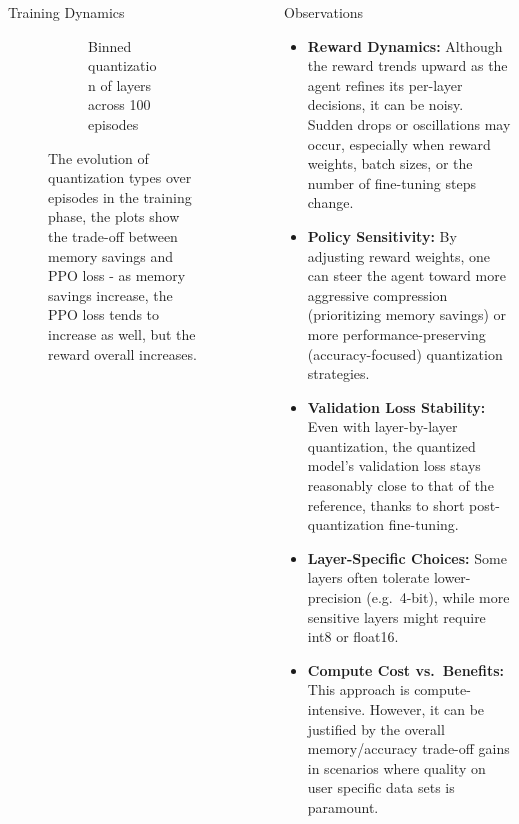 \documentclass[final]{beamer}
\newlength{\sepwidth}
\newlength{\colwidth}
\newcommand{\separatorcolumn}{\begin{column}{\sepwidth}\end{column}}
\begin{document}
\begin{frame}[t]
\begin{columns}[t]
\begin{column}{\colwidth}
\begin{block}{Training Dynamics}
\begin{figure}[ht]
\begin{subfigure}[b]{0.27\linewidth}
							\caption{\small Binned quantization of layers across 100 episodes}
							\label{subfig:reward_trend}
						\end{subfigure}
						
						\caption{\small The evolution of quantization types over episodes in the training phase, the plots show the trade-off between memory savings and PPO loss - as memory savings increase, the PPO loss tends to increase as well, but the reward overall increases.}
						\label{fig:training_plots}
					\end{figure}					
				\end{block}
				
			\end{column}
			
			\separatorcolumn
			
			\begin{column}{\colwidth}
				
				\begin{block}{Observations}
					\begin{itemize}
						\item \textbf{Reward Dynamics:} Although the reward trends upward as the agent refines its per-layer decisions, it can be noisy. Sudden drops or oscillations may occur, especially when reward weights, batch sizes, or the number of fine-tuning steps change.
						\item \textbf{Policy Sensitivity:} By adjusting reward weights, one can steer the agent toward more aggressive compression (prioritizing memory savings) or more performance-preserving (accuracy-focused) quantization strategies.
						\item \textbf{Validation Loss Stability:} Even with layer-by-layer quantization, the quantized model's validation loss stays reasonably close to that of the reference, thanks to short post-quantization fine-tuning.
						\item \textbf{Layer-Specific Choices:} Some layers often tolerate lower-precision (e.g.\ 4-bit), while more sensitive layers might require int8 or float16.
						\item \textbf{Compute Cost vs.\ Benefits:} This approach is compute-intensive. However, it can be justified by the overall memory/accuracy trade-off gains in scenarios where quality on user specific data sets is paramount.
					\end{itemize}
				\end{block}
				
				
				

\end{column}
\end{columns}
\end{frame}
\end{document}
